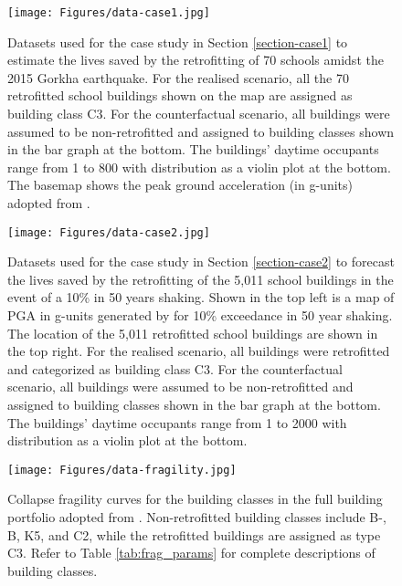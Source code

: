 \documentclass[utf8]{frontiersSCNS} %
\begin{document}
\begin{figure}[h!] 
\begin{center}
    \texttt{[image: Figures/data-case1.jpg]}
	\caption{Datasets used for the case study in Section \ref{section-case1} to estimate the lives saved by the retrofitting of 70 schools amidst the 2015 Gorkha earthquake. For the realised scenario, all the 70 retrofitted school buildings shown on the map are assigned as building class C3. For the counterfactual scenario, all buildings were assumed to be non-retrofitted and assigned to building classes shown in the bar graph at the bottom. The buildings’ daytime occupants range from 1 to 800 with distribution as a violin plot at the bottom. The basemap shows the peak ground acceleration (in g-units) adopted from \cite{chen20192015}.}
	\label{fig:datacase1}
\end{center}
\end{figure}

\begin{figure}[h!]
\begin{center}
     \texttt{[image: Figures/data-case2.jpg]}
		\caption{Datasets used for the case study in Section \ref{section-case2} to forecast the lives saved by the retrofitting of the 5,011 school buildings in the event of a 10\% in 50 years shaking. Shown in the top left is a map of PGA in g-units generated by \cite{stevens2018probabilistic} for 10\% exceedance in 50 year shaking. The location of the 5,011 retrofitted school buildings are shown in the top right. For the realised scenario, all buildings were retrofitted and categorized as building class C3. For the counterfactual scenario, all buildings were assumed to be non-retrofitted and assigned to building classes shown in the bar graph at the bottom. The buildings’ daytime occupants range from 1 to 2000 with distribution as a violin plot at the bottom.}
	\label{fig:datacase2}
\end{center}
\end{figure}
    
\begin{figure}[h!]
\begin{center}
    \texttt{[image: Figures/data-fragility.jpg]}
    \caption{Collapse fragility curves for the building classes in the full building portfolio adopted from \citep{jica2002study}. Non-retrofitted building classes include B-, B, K5, and C2, while the retrofitted buildings are assigned as type C3. Refer to Table \ref{tab:frag_params} for complete descriptions of building classes.}
    \label{fig:frag_curves}
\end{center}
\end{figure}
\end{document}
